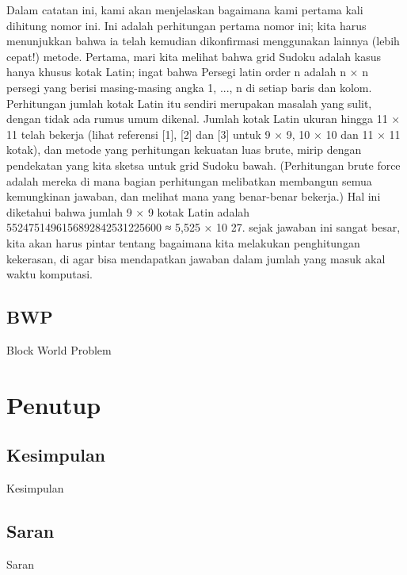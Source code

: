 \documentclass[11pt,a4paper]{report}
\begin{document}
Dalam catatan ini, kami akan menjelaskan bagaimana kami pertama kali dihitung nomor ini. Ini adalah perhitungan pertama
nomor ini; kita harus menunjukkan bahwa ia telah kemudian dikonfirmasi menggunakan lainnya (lebih cepat!) metode.
Pertama, mari kita melihat bahwa grid Sudoku adalah kasus hanya khusus kotak Latin; ingat bahwa
Persegi latin order n adalah n × n persegi yang berisi masing-masing angka 1, ..., n di setiap baris dan kolom.
Perhitungan jumlah kotak Latin itu sendiri merupakan masalah yang sulit, dengan tidak ada rumus umum
dikenal. Jumlah kotak Latin ukuran hingga 11 × 11 telah bekerja (lihat referensi [1], [2]
dan [3] untuk 9 × 9, 10 × 10 dan 11 × 11 kotak), dan metode yang perhitungan kekuatan luas brute,
mirip dengan pendekatan yang kita sketsa untuk grid Sudoku bawah. (Perhitungan brute force adalah mereka di mana bagian
perhitungan melibatkan membangun semua kemungkinan jawaban, dan melihat mana yang benar-benar bekerja.) Hal ini
diketahui bahwa jumlah 9 × 9 kotak Latin adalah 5524751496156892842531225600 ≈ 5,525 × 10 27. sejak
jawaban ini sangat besar, kita akan harus pintar tentang bagaimana kita melakukan penghitungan kekerasan, di
agar bisa mendapatkan jawaban dalam jumlah yang masuk akal waktu komputasi.
\section{BWP}
Block World Problem

\chapter{Penutup} %
\section{Kesimpulan}
Kesimpulan
\section{Saran}
Saran
\end{document}
